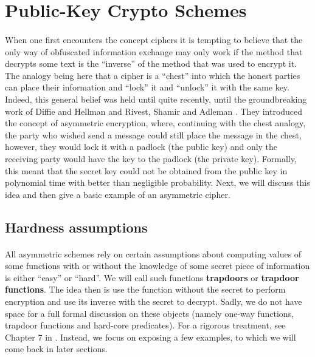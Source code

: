\documentclass{article}
\theoremstyle{definition}
\theoremstyle{example}
\begin{document}
\section{Public-Key Crypto Schemes}
\paragraph{} When one first encounters the concept ciphers it is tempting to believe that
the only way of obfuscated information exchange may only work if the method that
decrypts some text is the ``inverse'' of the method that was used to encrypt it.
The analogy being here that a cipher is a ``chest'' into which the honest
parties can place their information and ``lock'' it and ``unlock'' it with the
same key. Indeed, this general belief was held until quite recently, until the
groundbreaking work of Diffie and Hellman \cite{diffie1976new} and Rivest,
Shamir and Adleman \cite{rivest1978method}. They introduced the concept of
asymmetric encryption, where, continuing with the chest analogy, the party who
wished send a message could still place the message in the chest, however, they
would lock it with a padlock (the public key) and only the receiving party would
have the key to the padlock (the private key). Formally, this meant that the
secret key could not be obtained from the public key in polynomial time with
better than negligible probability. Next, we will discuss this idea and then
give a basic example of an asymmetric cipher.
\subsection{Hardness assumptions}
\label{sec:hardness_assumptions}
\paragraph{} All asymmetric schemes rely on certain assumptions about computing
values of some functions with or without the knowledge of some secret piece of
information is either ``easy'' or ``hard''. We will call such functions
\textbf{trapdoors} or \textbf{trapdoor functions}. The idea then is use the
function without the secret to perform encryption and use its inverse with the
secret to decrypt. Sadly, we do not have space for a
full formal discussion on these objects (namely one-way functions, trapdoor
functions and hard-core predicates). For a rigorous treatment, see Chapter 7 in \cite{katz2014introduction}.
Instead, we focus on exposing a few examples, to which we will come back in
later sections.
\end{document}
